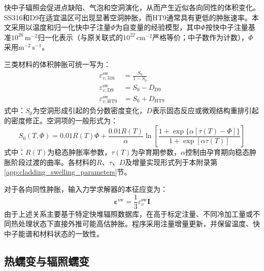 快中子辐照会促进点缺陷、气泡和空洞演化，从而产生近似各向同性的体积变化。SS316和D9在适宜温区可出现显著空洞肿胀，而HT9通常具有更低的肿胀速率。本文采用以温度和归一化快中子注量$\varPhi$为自变量的经验模型，其中$\varPhi$按快中子注量基准$10^{26}\,\mathrm{m^{-2}}$归一化表示（与原关联式的$10^{22}\,\mathrm{cm^{-2}}$严格等价；中子数作为计数），$\dot{\varPhi}$采用$\mathrm{m^{-2}\,s^{-1}}$\cite{halesBISONTheoryManual2016,hofmanMetallicFuelsHandbook2019}。

三类材料的体积肿胀可统一写为：
\begin{subequations}\label{eq:clad_volumetric_swelling_models}
	\begin{align}
		\varepsilon_{v,316}^{\mathrm{sw}}
		&=\frac{S_0}{1-S_0}
		\label{eq:ss316_volumetric_swelling}\\
		\varepsilon_{v,\mathrm{D9}}^{\mathrm{sw}}
		&=S_0-D_{\mathrm{D9}}
		\label{eq:d9_volumetric_swelling}\\
		\varepsilon_{v,\mathrm{HT9}}^{\mathrm{sw}}
		&=S_0+D_{\mathrm{HT9}}
		\label{eq:ht9_volumetric_swelling}
	\end{align}
\end{subequations}
\noindent 式中：$S_0$为空洞形成引起的负分数密度变化，$D$表示固态反应或微观结构重排引起的密度修正。空洞项的一般形式为：
\begin{equation}
	S_0(T,\varPhi)
	=0.01R(T)\varPhi+
	\frac{0.01R(T)}{\alpha}
	\ln\!\left[
	\frac{1+\exp\{\alpha[\tau(T)-\varPhi]\}}
	{1+\exp[\alpha\tau(T)]}
	\right]
	\label{eq:clad_void_swelling_inventory}
\end{equation}
\noindent 式中：$R(T)$为稳态肿胀率参数，$\tau(T)$为孕育期参数，$\alpha$控制由孕育期向稳态肿胀阶段过渡的曲率。各材料的$R$、$\tau$、$D$及增量实现形式列于本附录第\ref{app:cladding_swelling_parameters}节。

对于各向同性肿胀，输入力学求解器的本征应变为：
\begin{equation}
	\boldsymbol{\varepsilon}^{\mathrm{sw}}
	=\frac{1}{3}\varepsilon_v^{\mathrm{sw}}\boldsymbol I
	\label{eq:clad_isotropic_swelling_eigenstrain}
\end{equation}
由于上述关系主要基于特定快堆辐照数据库，在高于标定注量、不同冷加工量或不同热处理状态下直接外推可能高估肿胀。程序采用注量增量更新，并保留温度、快中子能谱和材料状态的一致性。

\subsection{热蠕变与辐照蠕变}
\label{sec:cladding_creep}

